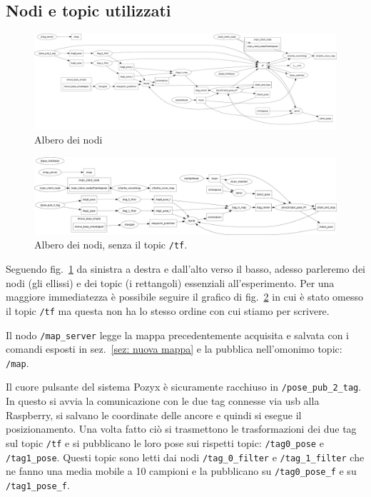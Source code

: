 	
\subsection{Nodi e topic utilizzati}
\label{sez:Ambiente ROS creato, nodi e topic}
\begin{figure}[h]
	\centering
	\includegraphics[width=\linewidth]{nodes_withtf_tree.pdf}
	\caption{Albero dei nodi}
	\label{fig: rqt_graph}
\end{figure}

\begin{figure}[h]
	\centering
	\includegraphics[width=\linewidth]{nodes_tree.pdf}
	\caption{Albero dei nodi, senza il topic \texttt{/tf}.}
	\label{fig: rqt_graph no tf}
\end{figure}



Seguendo fig.~\ref{fig: rqt_graph} da sinistra a destra e dall'alto verso il basso, adesso parleremo dei nodi (gli ellissi) e dei topic (i rettangoli) essenziali all'esperimento.
Per una maggiore immediatezza \`e possibile seguire il grafico di fig.~\ref{fig: rqt_graph no tf} in cui \`e stato omesso il topic \verb|/tf| ma questa non ha lo stesso ordine con cui stiamo per scrivere.

\vspace{0.5mm}
Il nodo \verb|/map_server| legge la mappa precedentemente acquisita e salvata con i comandi esposti in sez.~\ref{sez: nuova mappa} e la pubblica nell'omonimo topic: \verb|/map|.

Il cuore pulsante del sistema Pozyx \`e sicuramente racchiuso in \verb|/pose_pub_2_tag|. In questo si avvia la comunicazione con le due tag connesse via usb alla Raspberry, si salvano le coordinate delle ancore e quindi si esegue il posizionamento. 
Una volta fatto ci\`o si trasmettono le trasformazioni dei due tag sul topic \verb|/tf| e si pubblicano le loro pose sui rispetti topic: \verb|/tag0_pose| e \verb|/tag1_pose|.
Questi topic sono letti dai nodi \verb|/tag_0_filter| e \verb|/tag_1_filter| che ne fanno una media mobile a 10 campioni e la pubblicano su \verb|/tag0_pose_f| e su \verb|/tag1_pose_f|.

